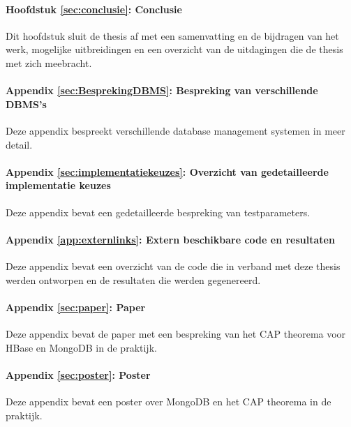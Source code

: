 \paragraph{Hoofdstuk \ref{sec:conclusie}: Conclusie} Dit hoofdstuk sluit de thesis af met een samenvatting en de bijdragen van het werk, mogelijke uitbreidingen en een overzicht van de uitdagingen die de thesis met zich meebracht. 

\paragraph{Appendix \ref{sec:BesprekingDBMS}: Bespreking van verschillende DBMS's} Deze appendix bespreekt verschillende database management systemen in meer detail. 

\paragraph{Appendix \ref{sec:implementatiekeuzes}: Overzicht van gedetailleerde implementatie keuzes} Deze appendix bevat een gedetailleerde bespreking van testparameters. 

\paragraph{Appendix \ref{app:externlinks}: Extern beschikbare code en resultaten} Deze appendix bevat een overzicht van de code die in verband met deze thesis werden ontworpen en de resultaten die werden gegenereerd. 

\paragraph{Appendix \ref{sec:paper}: Paper} Deze appendix bevat de paper met een bespreking van het CAP theorema voor HBase en MongoDB in de praktijk. 

\paragraph{Appendix \ref{sec:poster}: Poster} Deze appendix bevat een poster over MongoDB en het CAP theorema in de praktijk. 